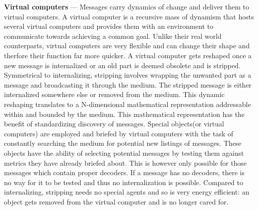\documentclass[a4paper, 10pt]{article}
\begin{document}
\par
\textbf{Virtual computers} --- Messages carry dynamics of change and deliver them to virtual computers. A virtual computer is a recursive mass of dynamism that hosts several virtual computers and provides them with an environment to communicate towards achieving a common goal. Unlike their real world counterparts, virtual computers are very flexible and can change their shape and therfore their function far more quicker. A virtual computer gets reshaped once a new message is internalized or an old part is deemed obsolete and is stripped. Symmetrical to internalizing, stripping involves wrapping the unwanted part as a message and broadcasting it through the medium. The stripped message is either internalized somewhere else or removed from the medium. This dynamic reshaping translates to a N-dimensional mathematical representation addressable within and bounded by the medium. This mathematical representation has the benefit of standardizing discovery of messages. Special objects(or virtual computers) are employed and briefed by virtual computers with the task of constantly searching the medium for potential new listings of messages. These objects have the ability of selecting potential messages by testing them against metrics they have already briefed about. This is however only possible for those messages which contain proper decoders. If a message has no decoders, there is no way for it to be tested and thus no internalization is possible. Compared to internalizing, stripping needs no special agents and so is very energy efficient: an object gets removed from the virtual computer and is no longer cared for. 
\par
\end{document}
